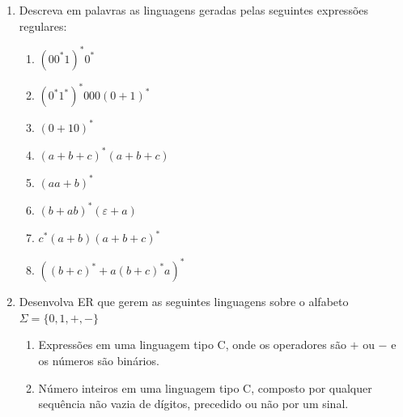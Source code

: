 \documentclass[12pt]{article}
\def\ve{\varepsilon}
\begin{document}
\vspace{3em}



\begin{enumerate}



\item Descreva em palavras as linguagens geradas pelas seguintes expressões regulares:

\begin{enumerate}

\item $(00^*1)^*0^*$

\item $(0^*1^*)^*000(0+1)^*$

\item $(0+10)^*$

\item $(a+b+c)^*(a+b+c)$

\item $(aa+b)^*$

\item $(b+ab)^*(\ve+a)$

\item $c^*(a+b)(a+b+c)^*$

\item $((b+c)^*+a(b+c)^*a)^*$


\end{enumerate}





\break





\item Desenvolva ER que gerem as seguintes linguagens sobre o alfabeto $\Sigma = \{0,1,+,-\}$

\begin{enumerate}

\item Expressões em uma linguagem tipo C, onde os operadores são $+$ ou $-$ e os números são binários.

\item Número inteiros em uma linguagem tipo C, composto por qualquer sequência não vazia de dígitos, precedido ou não por um sinal.

\end{enumerate}





\end{enumerate}
\end{document}
